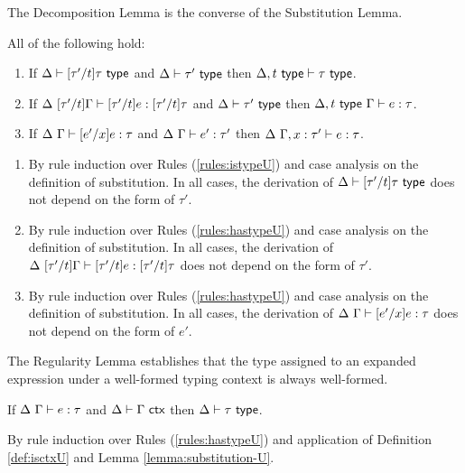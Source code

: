 The Decomposition Lemma is the converse of the Substitution Lemma.
\begin{lemma}[Decomposition]\label{lemma:decomposition-U} All of the following hold:
\begin{enumerate}
\item If $\Delta \vdash [\tau'/t]\tau~\mathsf{type}$ and $\Delta \vdash \tau'~\mathsf{type}$ then $\Delta, t~\mathsf{type} \vdash \tau~\mathsf{type}$.
\item If $\Delta~[\tau'/t]\Gamma \vdash [\tau'/t]e : [\tau'/t]\tau$ and $\Delta \vdash \tau'~\mathsf{type}$ then $\Delta, t~\mathsf{type}~\Gamma \vdash e : \tau$.
\item If $\Delta~\Gamma \vdash [e'/x]e : \tau$ and $\Delta~\Gamma \vdash e' : \tau'$ then $\Delta~\Gamma, x : \tau' \vdash e : \tau$.
\end{enumerate}\end{lemma}
\begin{proof-sketch}
\begin{enumerate}
\item By rule induction over Rules (\ref{rules:istypeU}) and case analysis on the definition of substitution. In all cases, the derivation of $\Delta \vdash [\tau'/t]\tau~\mathsf{type}$ does not depend on the form of $\tau'$.
\item By rule induction over Rules (\ref{rules:hastypeU}) and case analysis on the definition of substitution. In all cases, the derivation of $\Delta~[\tau'/t]\Gamma \vdash [\tau'/t]e : [\tau'/t]\tau$ does not depend on the form of $\tau'$.
\item By rule induction over Rules (\ref{rules:hastypeU}) and case analysis on the definition of substitution. In all cases, the derivation of $\Delta~\Gamma \vdash [e'/x]e : \tau$ does not depend on the form of $e'$.
\end{enumerate}
\end{proof-sketch}

The Regularity Lemma establishes that the type assigned to an expanded expression under a well-formed typing context is always well-formed. 
\begin{lemma}[Regularity]\label{lemma:regularity-U} If $\Delta~\Gamma \vdash e : \tau$ and $\Delta \vdash \Gamma~\mathsf{ctx}$ then $\Delta \vdash \tau~\mathsf{type}$.\end{lemma}
\begin{proof-sketch}
By rule induction over Rules (\ref{rules:hastypeU}) and application of Definition \ref{def:isctxU} and Lemma \ref{lemma:substitution-U}.
\end{proof-sketch}

